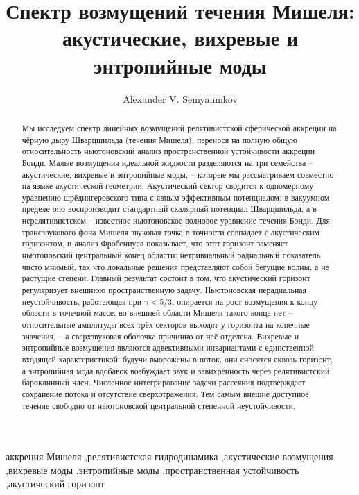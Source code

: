 \documentclass[12pt,a4paper,preprint,nopreprintline]{elsarticle}
\begin{document}
\makeatletter
\setlength{\@fptop}{0pt}%
\setlength{\@fpsep}{8pt}%
\setlength{\@fpbot}{0pt plus 1fil}%
\makeatother

\begin{frontmatter}

\title{Спектр возмущений течения Мишеля:\\
акустические, вихревые и энтропийные моды}

\author{Alexander V. Semyannikov}
\address{Independent Researcher}

\begin{abstract}
Мы исследуем спектр линейных возмущений релятивистской сферической аккреции на чёрную дыру Шварцшильда (течения Мишеля), перенося на полную общую относительность ньютоновский анализ пространственной устойчивости аккреции Бонди. Малые возмущения идеальной жидкости разделяются на три семейства -- акустические, вихревые и энтропийные моды, -- которые мы рассматриваем совместно на языке акустической геометрии. Акустический сектор сводится к одномерному уравнению шрёдингеровского типа с явным эффективным потенциалом: в вакуумном пределе оно воспроизводит стандартный скалярный потенциал Шварцшильда, а в нерелятивистском -- известное ньютоновское волновое уравнение течения Бонди. Для трансзвукового фона Мишеля звуковая точка в точности совпадает с акустическим горизонтом, и анализ Фробениуса показывает, что этот горизонт заменяет ньютоновский центральный конец области: нетривиальный радиальный показатель чисто мнимый, так что локальные решения представляют собой бегущие волны, а не растущие степени. Главный результат состоит в том, что акустический горизонт регуляризует внешнюю пространственную задачу. Ньютоновская нерадиальная неустойчивость, работающая при $\gamma<5/3$, опирается на рост возмущения к концу области в точечной массе; во внешней области Мишеля такого конца нет -- относительные амплитуды всех трёх секторов выходят у горизонта на конечные значения, -- а сверхзвуковая оболочка причинно от неё отделена. Вихревые и энтропийные возмущения являются адвективными инвариантами с единственной входящей характеристикой: будучи вморожены в поток, они сносятся сквозь горизонт, а энтропийная мода вдобавок возбуждает звук и завихрённость через релятивистский бароклинный член. Численное интегрирование задачи рассеяния подтверждает сохранение потока и отсутствие сверхотражения. Тем самым внешне доступное течение свободно от ньютоновской центральной степенной неустойчивости.
\end{abstract}

\begin{keyword}
аккреция Мишеля \sep релятивистская гидродинамика \sep акустические возмущения \sep вихревые моды \sep энтропийные моды \sep пространственная устойчивость \sep акустический горизонт
\end{keyword}

\end{frontmatter}
\end{document}
